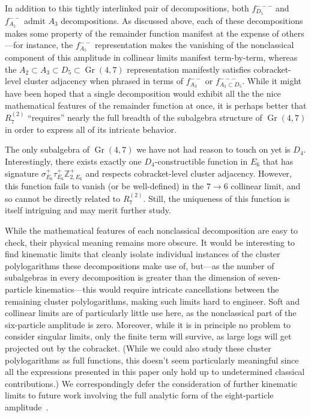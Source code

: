 \documentclass[12pt]{article}
\DeclareMathOperator{\Gr}{Gr}
\begin{document}
In addition to this tightly interlinked pair of decompositions, both $f_{D_5}^{---}$ and $f_{A_5}^{--}$ admit $A_3$ decompositions. As discussed above, each of these decompositions makes some property of the remainder function manifest at the expense of others---for instance, the $f_{A_5}^{--}$ representation makes the vanishing of the nonclassical component of this amplitude in collinear limits manifest term-by-term, whereas the $A_2 \subset A_3 \subset D_5 \subset \Gr(4,7)$ representation manifestly satisfies cobracket-level cluster adjacency when phrased in terms of $f_{A_3}^{--}$ or $f_{A_3\subset D_5}^{---}$. While it might have been hoped that a single decomposition would exhibit all the the nice mathematical features of the remainder function at once, it is perhaps better that $R^{(2)}_7$ ``requires'' nearly the full breadth of the subalgebra structure of $\Gr(4,7)$ in order to express all of its intricate behavior. 

The only subalgebra of $\Gr(4,7)$ we have not had reason to touch on yet is $D_4$. Interestingly, there exists exactly one $D_4$-constructible function in $E_6$ that has signature $\sigma_{E_6}^+ \tau_{E_6}^+ \mathbb{Z}_{2,E_6}^+$ and respects cobracket-level cluster adjacency. However, this function fails to vanish (or be well-defined) in the $7\to6$ collinear limit, and so cannot be directly related to $R_{7}^{(2)}\!$. Still, the uniqueness of this function is itself intriguing and may merit further study.

While the mathematical features of each nonclassical decomposition are easy to check, their physical meaning remains more obscure. It would be interesting to find kinematic limits that cleanly isolate individual instances of the cluster polylogarithms these decompositions make use of, but---as the number of subalgebras in every decomposition is greater than the dimension of seven-particle kinematics---this would require intricate cancellations between the remaining cluster polylogarithms, making such limits hard to engineer. Soft and collinear limits are of particularly little use here, as the nonclassical part of the six-particle amplitude is zero. Moreover, while it is in principle no problem to consider singular limits, only the finite term will survive, as large logs will get projected out by the cobracket. (While we could also study these cluster polylogarithms as full functions, this doesn't seem particularly meaningful since all the expressions presented in this paper only hold up to undetermined classical contributions.)  We correspondingly defer the consideration of further kinematic limits to future work involving the full analytic form of the eight-particle amplitude~\cite{cluster_subalgebras_ii}.
\end{document}
